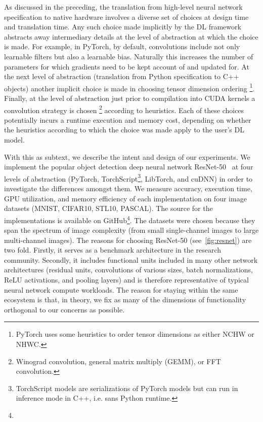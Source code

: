 As discussed in the preceding, the translation from high-level neural network specification to native hardware involves a diverse set of choices at design time and translation time.
Any such choice made implicitly by the DL framework abstracts away intermediary details at the level of abstraction at which the choice is made.
For example, in PyTorch, by default, convolutions include not only learnable filters but also a learnable bias.
Naturally this increases the number of parameters for which gradients need to be kept account of and updated for.
At the next level of abstraction (translation from Python specification to C++ objects) another implicit choice is made in choosing tensor dimension ordering%
\footnote{PyTorch uses some heuristics to order tensor dimensions as either NCHW or NHWC.}.
Finally, at the level of abstraction just prior to compilation into CUDA kernels a convolution strategy is chosen%
\footnote{Winograd convolution, general matrix multiply (GEMM), or FFT convolution.} according to heuristics.
Each of these choices potentially incurs a runtime execution and memory cost, depending on whether the heuristics according to which the choice was made apply to the user's DL model.

With this as subtext, we describe the intent and design of our experiments.
We implement the popular object detection deep neural network ResNet-50~\cite{he2015deep} at four levels of abstraction (PyTorch, TorchScript\footnote{TorchScript models are serializations of PyTorch models but can run in inference mode in C++, i.e. sans Python runtime.}, LibTorch, and cuDNN) in order to investigate the differences amongst them.
We measure accuracy, execution time, GPU utilization, and memory efficiency of each implementation on four image datasets (MNIST, CIFAR10, STL10, PASCAL).
The source for the implementations is available on GitHub\footnote{}.
The datasets were chosen because they span the spectrum of image complexity (from small single-channel images to large multi-channel images).
The reasons for choosing ResNet-50 (see~\cref{fig:resnet}) are two fold.
Firstly, it serves as a benchmark architecture in the research community.
Secondly, it includes functional units included in many other network architectures (residual units, convolutions of various sizes, batch normalizations, ReLU activations, and pooling layers) and is therefore representative of typical neural network compute workloads.
The reason for staying within the same ecosystem is that, in theory, we fix as many of the dimensions of functionality orthogonal to our concerns as possible.

